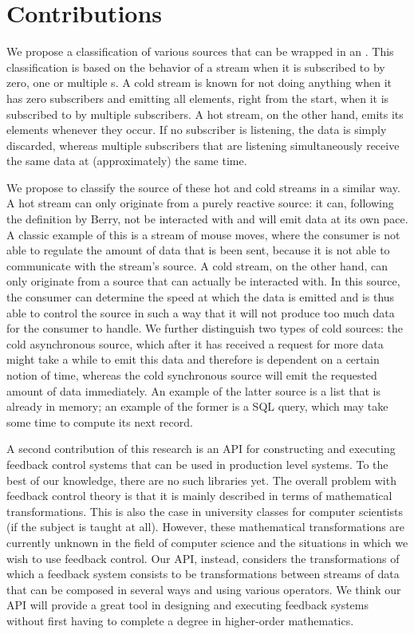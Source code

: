 \section{Contributions}
We propose a classification of various sources that can be wrapped in an \obs. This classification is based on the behavior of a stream when it is subscribed to by zero, one or multiple s. A cold stream is known for not doing anything when it has zero subscribers and emitting all elements, right from the start, when it is subscribed to by multiple subscribers. A hot stream, on the other hand, emits its elements whenever they occur. If no subscriber is listening, the data is simply discarded, whereas multiple subscribers that are listening simultaneously receive the same data at (approximately) the same time.

We propose to classify the source of these hot and cold streams in a similar way. A hot stream can only originate from a purely reactive source: it can, following the definition by Berry, not be interacted with and will emit data at its own pace. A classic example of this is a stream of mouse moves, where the consumer is not able to regulate the amount of data that is been sent, because it is not able to communicate with the stream's source. A cold stream, on the other hand, can only originate from a source that can actually be interacted with. In this source, the consumer can determine the speed at which the data is emitted and is thus able to control the source in such a way that it will not produce too much data for the consumer to handle. We further distinguish two types of cold sources: the cold asynchronous source, which after it has received a request for more data might take a while to emit this data and therefore is dependent on a certain notion of time, whereas the cold synchronous source will emit the requested amount of data immediately. An example of the latter source is a list that is already in memory; an example of the former is a SQL query, which may take some time to compute its next record.

A second contribution of this research is an API for constructing and executing feedback control systems that can be used in production level systems. To the best of our knowledge, there are no such libraries yet. The overall problem with feedback control theory is that it is mainly described in terms of mathematical transformations. This is also the case in university classes for computer scientists (if the subject is taught at all). However, these mathematical transformations are currently unknown in the field of computer science and the situations in which we wish to use feedback control. Our API, instead, considers the transformations of which a feedback system consists to be transformations between streams of data that can be composed in several ways and using various operators. We think our API will provide a great tool in designing and executing feedback systems without first having to complete a degree in higher-order mathematics.

